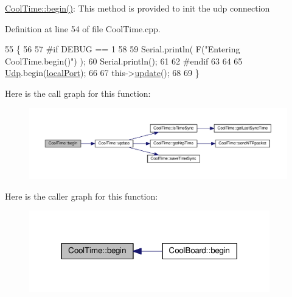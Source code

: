 \hyperlink{class_cool_time_ab1976cf718b950bc31e003c3323b8adb}{Cool\+Time\+::begin()}\+: This method is provided to init the udp connection 

Definition at line 54 of file Cool\+Time.\+cpp.


\begin{DoxyCode}
55 \{
56 
57 \textcolor{preprocessor}{#if DEBUG == 1 }
58 
59     Serial.println( F(\textcolor{stringliteral}{"Entering CoolTime.begin()"}) );
60     Serial.println();
61 
62 \textcolor{preprocessor}{#endif }
63 
64 
65     \hyperlink{class_cool_time_a4e23216a8121ca79d0fb019f30884b92}{Udp}.begin(\hyperlink{class_cool_time_a2f777da44d7ba678be8185299e9b49d1}{localPort});
66     
67     this->\hyperlink{class_cool_time_aae601f795452cfa48d9fb337aed483a8}{update}();
68     
69 \}
\end{DoxyCode}
Here is the call graph for this function\+:\nopagebreak
\begin{figure}[H]
\begin{center}
\leavevmode
\includegraphics[width=350pt]{d6/d49/class_cool_time_ab1976cf718b950bc31e003c3323b8adb_cgraph}
\end{center}
\end{figure}
Here is the caller graph for this function\+:\nopagebreak
\begin{figure}[H]
\begin{center}
\leavevmode
\includegraphics[width=296pt]{d6/d49/class_cool_time_ab1976cf718b950bc31e003c3323b8adb_icgraph}
\end{center}
\end{figure}
\mbox{\label{class_cool_time_a87c28260c1bc77091162cbcf1ee2e129}} 
